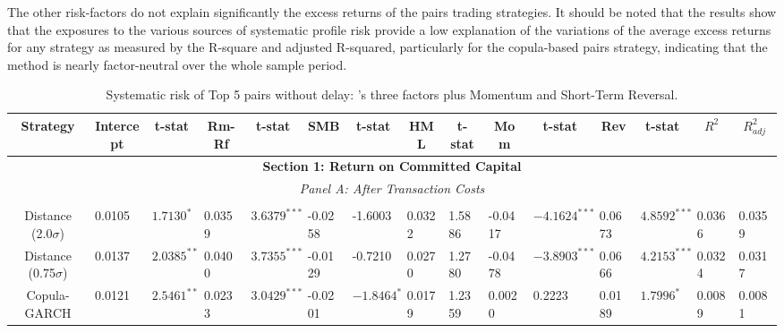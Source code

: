 \documentclass[a4paper]{article}
\begin{document}
The other risk-factors do not explain significantly the excess returns of the pairs trading strategies. It should be noted that the results show that the exposures to the various sources of systematic profile risk provide a low explanation of the variations of the average excess returns for any strategy as measured by the R-square and adjusted R-squared, particularly for the copula-based pairs strategy, indicating that the method is nearly factor-neutral over the whole sample period.


		\begin{sidewaystable}
		\caption{Systematic risk of Top 5 pairs without delay: \citet*{ff93}'s three factors plus Momentum and Short-Term Reversal.}
		\begin{threeparttable}[H]
			\centering \scriptsize
			\begin{tabularx}{\textwidth}{@{\extracolsep{\fill}}lllllllllllllll@{}}
				\toprule
				\multicolumn{1}{c}{Strategy} & \multicolumn{1}{c}{Intercept} & \multicolumn{1}{c}{t-stat} & \multicolumn{1}{c}{Rm-Rf} & \multicolumn{1}{c}{t-stat} & \multicolumn{1}{c}{SMB} & \multicolumn{1}{c}{t-stat} & \multicolumn{1}{c}{HML} & \multicolumn{1}{c}{t-stat} & \multicolumn{1}{c}{Mom} & \multicolumn{1}{c}{t-stat} & \multicolumn{1}{c}{Rev} & \multicolumn{1}{c}{t-stat} & \multicolumn{1}{c}{$R^{2}$} & \multicolumn{1}{c}{$R^{2}_{adj}$} \\
				\midrule
				\multicolumn{15}{c}{\textbf{Section 1: Return on Committed Capital}} \\
				\multicolumn{15}{c}{\textit{Panel A: After Transaction Costs}} \\
				\multicolumn{1}{c}{} & \multicolumn{1}{c}{} & \multicolumn{1}{c}{} & \multicolumn{1}{c}{} & \multicolumn{1}{c}{} & \multicolumn{1}{c}{} & \multicolumn{1}{c}{} & \multicolumn{1}{c}{} &       &       &       &       &       &       &  \\
				\multicolumn{1}{c}{Distance (2.0$\sigma$)} & 0.0105 & $1.7130^{*}$ & 0.0359 & $3.6379^{***}$ & -0.0258 & -1.6003 & 0.0322 & 1.5886 & -0.0417 & $-4.1624^{***}$ & 0.0673 & $4.8592^{***}$ & 0.0366 & 0.0359 \\
				\multicolumn{1}{c}{Distance (0.75$\sigma$)} & 0.0137 & $2.0385^{**}$ & 0.0400 & $3.7355^{***}$ & -0.0129 & -0.7210 & 0.0270 & 1.2780 & -0.0478 & $-3.8903^{***}$ & 0.0666 & $4.2153^{***}$ & 0.0324 & 0.0317 \\
				\multicolumn{1}{c}{Copula-GARCH} & 0.0121 & $2.5461^{**}$ & 0.0233 & $3.0429^{***}$ & -0.0201 & $-1.8464^{*}$ & 0.0179 & 1.2359 & 0.0020 & 0.2223 & 0.0189 & $1.7996^{*}$ & 0.0089 & 0.0081  \\

\end{tabularx}
\end{threeparttable}
\end{sidewaystable}
\end{document}
